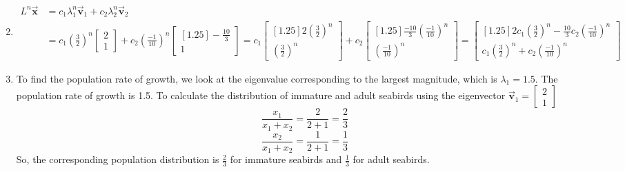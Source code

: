 \documentclass[letter,11pt]{article}
\theoremstyle{definition}
\begin{document}
\begin{tcolorbox}
\begin{enumerate}[label = (\Alph*.)]
\begin{align*}
            \end{align*}
        \item 
            \begin{align*}
                L^n \vec{\boldsymbol{x}} &= c_{1}\lambda_{1}^{n}\vec{\boldsymbol{v}}_{1} + c_{2}\lambda_{2}^{n}\vec{\boldsymbol{v}}_{2}\\
                &= c_{1} \left(\frac{3}{2}\right)^{n}\begin{bmatrix} 2 \\ 1 \end{bmatrix} + c_{2} \left(\frac{-1}{10}\right)^{n}\begin{bmatrix}[1.25] -\frac{10}{3} \\ 1 \end{bmatrix} = c_{1}\begin{bmatrix}[1.25] 2\left(\frac{3}{2}\right)^{n} \\ \left(\frac{3}{2}\right)^{n} \end{bmatrix} + c_{2} \begin{bmatrix}[1.25] \frac{-10}{3}\left(\frac{-1}{10}\right)^{n} \\ \left(\frac{-1}{10}\right)^{n}\end{bmatrix} = \begin{bmatrix}[1.25] 2c_{1}\left(\frac{3}{2}\right)^{n} - \frac{10}{3}c_{2}\left(\frac{-1}{10}\right)^{n}\\ c_{1}\left(\frac{3}{2}\right)^{n} + c_{2}\left(\frac{-1}{10}\right)^{n} \end{bmatrix}
            \end{align*}
            \item   To find the population rate of growth, we look at the eigenvalue corresponding to the largest magnitude, which is $\lambda_{1} = 1.5$. The population rate of growth is 1.5. To calculate the distribution of immature and adult seabirds using the eigenvector $\vec{\boldsymbol{v}}_{1} = \begin{bmatrix}2\\1 \end{bmatrix}$
            $$\frac{x_1}{x_1+x_2} = \frac{2}{2+1} = \frac{2}{3}$$  
            $$\frac{x_2}{x_1+x_2}=\frac{1}{2+1} = \frac{1}{3}$$
            So, the corresponding population distribution is $\frac{2}{3}$ for immature seabirds and $\frac{1}{3}$ for adult seabirds.
    \end{enumerate}
\end{tcolorbox}
\end{document}
